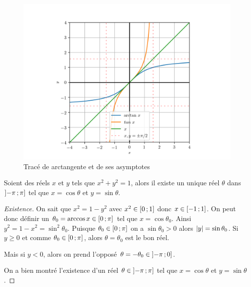 \begin{figure}
  \centering
  \includegraphics[scale=0.8]{arctan.png}
  \caption{Tracé de arctangente et de ses asymptotes}
  \label{fig:tracearctangente}
\end{figure}
\newpage
\begin{theo}
  \label{chap1-theo:thetasin}
  Soient des réels \(x\) et \(y\) tels que \(x^2+y^2=1\), alors il existe un unique réel \(\theta\) dans \(\left] -\pi \, ;  \pi \right]\) tel que \(x=\cos \theta\) et \(y=\sin \theta\).
\end{theo}
\begin{proof}[Existence]
  On sait que \(x^2=1-y^2\) avec \(x^2 \in \left[ 0 \, ;  1 \right]\) donc \(x \in \left[ -1 \, ;  1 \right]\). On peut donc définir un \(\theta_0=\arccos x \in \left[ 0 \, ;  \pi \right]\) tel que \(x=\cos \theta_0\). Ainsi \(y^2=1-x^2=\sin^2 \theta_0\). Puisque \(\theta_0 \in \left[ 0 \, ;  \pi \right]\) on a \(\sin \theta_0>0\) alors \(\left\lvert y\right\rvert=\sin \theta_0\).
Si \(y \geqslant 0\) et comme \(\theta_0 \in \left[ 0 \, ;  \pi \right]\), alors \(\theta=\theta_0\) est le bon réel.

Mais si \(y<0\), alors on prend l'opposé \(\theta=-\theta_0 \in \left] -\pi \, ;  0 \right]\).

On a bien montré l'existence d'un réel \(\theta \in \left] -\pi \, ;  \pi \right]\) tel que \(x=\cos \theta\) et \(y=\sin \theta\).
\end{proof}
